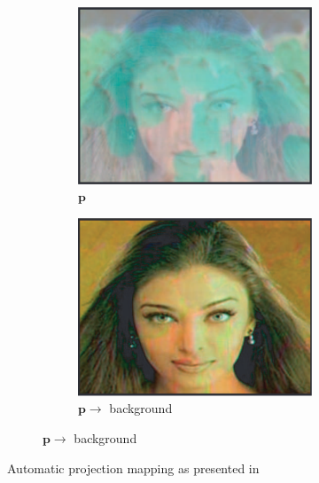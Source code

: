 \begin{figure}
\begin{subfigure}{0.8\textwidth}
        \begin{subfigure}{0.34\textwidth}
            \centering
            \includegraphics[width=\textwidth]{images/01-compensation_image.png}
            \caption{\(\bm{p}\)}
            \label{fig:intro_grossberg-compensation}
        \end{subfigure}
        \hfill
        \begin{subfigure}{0.34\textwidth}
            \centering
            \includegraphics[width=\textwidth]{images/01-new_appearance.png}
            \caption{\(\bm{p} \rightarrow\) background}
            \label{fig:intro_grossberg-new_appearance}
        \end{subfigure}
    \end{subfigure}
    \caption{Automatic projection mapping as presented in \citet{Grossberg2004}}
    \label{fig:intro_grossberg}
\end{figure}

